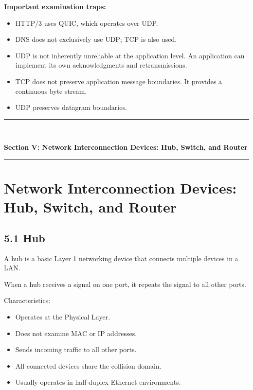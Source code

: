 \textbf{Important examination traps:}

\begin{itemize}
    \item HTTP/3 uses QUIC, which operates over UDP.
    \item DNS does not exclusively use UDP; TCP is also used.
    \item UDP is not inherently unreliable at the application level. An application can implement its own acknowledgments and retransmissions.
    \item TCP does not preserve application message boundaries. It provides a continuous byte stream.
    \item UDP preserves datagram boundaries.
\end{itemize}


\newpage

\newpage
\begin{center}
\vspace{0.5em}
{\color{primary}\rule{0.45\textwidth}{1.2pt}\\[4pt]}
{\Large\bfseries\color{primary} Section V: Network Interconnection Devices: Hub, Switch, and Router\\[2pt]}
{\color{primary}\rule{0.45\textwidth}{1.2pt}}
\vspace{0.5em}
\end{center}

\section{Network Interconnection Devices: Hub, Switch, and Router}

\subsection{5.1 Hub}

A hub is a basic Layer 1 networking device that connects multiple devices in a LAN.

When a hub receives a signal on one port, it repeats the signal to all other ports.

Characteristics:

\begin{itemize}
    \item Operates at the Physical Layer.
    \item Does not examine MAC or IP addresses.
    \item Sends incoming traffic to all other ports.
    \item All connected devices share the collision domain.
    \item Usually operates in half-duplex Ethernet environments.
\end{itemize}

